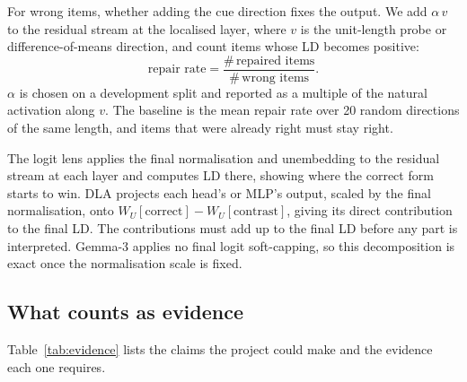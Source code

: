 \documentclass[11pt,a4paper]{article}
\begin{document}
\begin{description}[leftmargin=0pt,itemsep=0.4em]
  \item[Repair rate.] For wrong items, whether adding the cue direction fixes the output. We add $\alpha\,v$ to the residual stream at the localised layer, where $v$ is the unit-length probe or difference-of-means direction, and count items whose LD becomes positive:
  \[ \text{repair rate} = \frac{\#\,\text{repaired items}}{\#\,\text{wrong items}}. \]
  $\alpha$ is chosen on a development split and reported as a multiple of the natural activation along $v$. The baseline is the mean repair rate over 20 random directions of the same length, and items that were already right must stay right.

  \item[Logit lens and direct logit attribution (DLA).] The logit lens applies the final normalisation and unembedding to the residual stream at each layer and computes LD there, showing where the correct form starts to win. DLA projects each head's or MLP's output, scaled by the final normalisation, onto $W_U[\text{correct}] - W_U[\text{contrast}]$, giving its direct contribution to the final LD. The contributions must add up to the final LD before any part is interpreted. Gemma-3 applies no final logit soft-capping, so this decomposition is exact once the normalisation scale is fixed.
\end{description}

\subsection{What counts as evidence}

Table~\ref{tab:evidence} lists the claims the project could make and the evidence each one requires.
\end{document}

